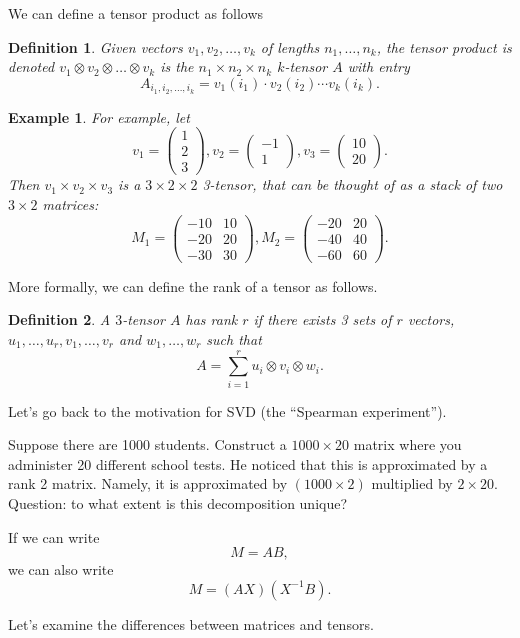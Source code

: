 \documentclass[12pt]{article}
\newtheorem*{example}{Example}
\newtheorem*{definition}{Definition}
\newcommand*{\mat}[1]{\begin{pmatrix}#1\end{pmatrix}}
\begin{document}
We can define a tensor product as follows \\
\begin{definition}
  Given vectors $v_1, v_2, \dots, v_k$ of lengths $n_1, \dots, n_k$, the tensor product is denoted $v_1 \otimes v_2 \otimes \dots \otimes v_k$ is the $n_1 \times n_2 \times n_k$ $k$-tensor $A$ with entry
  \[
    A_{i_1, i_2, \dots, i_k} = v_1(i_1) \cdot v_2(i_2) \cdots v_k (i_k).
  \]
\end{definition}

\begin{example}
  For example, let
  \[
    v_1 = \mat{1 \\ 2 \\ 3}, v_2 = \mat{-1 \\ 1}, v_3 = \mat{10 \\ 20}.
  \]
  Then $v_1 \times v_2 \times v_3$ is a $3 \times 2 \times 2$ 3-tensor, that can be thought of as a stack of two $3 \times 2$ matrices:
  \[
    M_1 = \mat{-10 & 10 \\ -20 & 20 \\ -30 & 30}, M_2 = \mat{-20 & 20 \\ -40 & 40 \\ -60 & 60}.
  \]
\end{example}

More formally, we can define the rank of a tensor as follows.

\begin{definition}
  A $3$-tensor $A$ has rank $r$ if there exists 3 sets of $r$ vectors, $u_1, \dots, u_r, v_1, \dots, v_r$ and $w_1, \dots, w_r$ such that
  \[
    A = \sum_{i=1}^{r} u_i \otimes v_i \otimes w_i.
  \]
\end{definition}

Let's go back to the motivation for SVD (the ``Spearman experiment'').

Suppose there are 1000 students.  Construct a $1000 \times 20$ matrix where you administer 20 different school tests.  He noticed that this is approximated by a rank 2 matrix.  Namely, it is approximated by $(1000 \times 2)$ multiplied by $2 \times 20$.  Question: to what extent is this decomposition unique?

If we can write
\[
  M = AB,
\]
we can also write
\[
  M = (AX) (X^{-1} B).
\]

Let's examine the differences between matrices and tensors.
\end{document}
